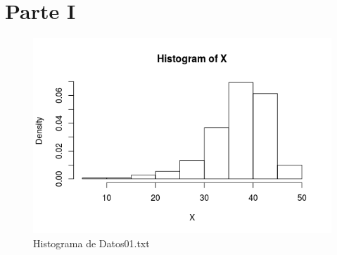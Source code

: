 \documentclass{article}
\begin{document}
\section*{Parte I}
\begin{figure}[h!]
\centering
\includegraphics[scale=0.8]{./figures/hist_X.png}
\caption{Histograma de Datos01.txt}
\end{figure}
\end{document}
